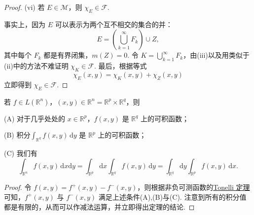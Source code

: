 \documentclass[../../main.tex]{subfiles}
\begin{document}
\begin{proof}
(vi) 若 \( E \in \mathcal{M} \)，则 \( \chi_E \in \mathcal{F} \).

事实上，因为 \( E \) 可以表示为两个互不相交的集合的并：
\[
E = \left( \bigcup_{k = 1}^{\infty} F_k \right) \cup Z,
\]
其中每个 \( F_k \) 都是有界闭集，\( m(Z) = 0 \). 令 \( K = \bigcup_{k = 1}^{\infty} F_k \)，由(iii)以及用类似于(ii)中的方法不难证明 \( \chi_K \in \mathcal{F} \). 最后，根据等式
\[
\chi_E(x, y) = \chi_K(x, y) + \chi_Z(x, y)
\]
立即得到 \( \chi_E \in \mathcal{F} \).
\end{proof}

\begin{theorem}\label{theorem:Fubini定理 可积函数的情形}
若 \( f \in L(\mathbb{R}^n) \)，\( (x, y) \in \mathbb{R}^n = \mathbb{R}^p \times \mathbb{R}^q \)，则

(A) 对于几乎处处的 \( x \in \mathbb{R}^p \)，\( f(x, y) \) 是 \( \mathbb{R}^q \) 上的可积函数；

(B) 积分$\int_{\mathbb{R}^q} f(x, y) \, \mathrm{d}y$
是 \( \mathbb{R}^p \) 上的可积函数；

(C) 我们有
\[
\int_{\mathbb{R}^n} f(x, y) \, \mathrm{d}x\mathrm{d}y = \int_{\mathbb{R}^p} \mathrm{d}x \int_{\mathbb{R}^q} f(x, y) \, \mathrm{d}y = \int_{\mathbb{R}^q} \mathrm{d}y \int_{\mathbb{R}^p} f(x, y) \, \mathrm{d}x.
\]
\end{theorem}
\begin{proof}
令 \( f(x, y) = f^+(x, y) - f^-(x, y) \)，则根据非负可测函数的\hyperref[theorem:Tonelli 定理 非负可测函数的情形]{Tonelli 定理}可知，\( f^+(x, y) \) 与 \( f^-(x, y) \) 满足上述条件(A),(B)与(C). 注意到所有的积分值都是有限的，从而可以作减法运算，并立即得出定理的结论.
\end{proof}
\end{document}
